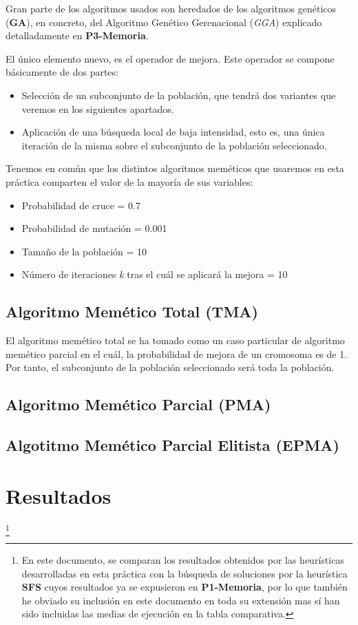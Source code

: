 \documentclass[a4paper, 11pt]{article}
\begin{document}
			Gran parte de los algoritmos usados son heredados de los algoritmos genéticos (\textbf{GA}),
			en concreto, del Algoritmo Genético Gerenacional (\textit{GGA}) explicado detalladamente en
			\textbf{P3-Memoria}.
			
			El único elemento nuevo, es el operador de mejora. Este operador se compone básicamente
			de dos partes:
			\begin{itemize}
				\item Selección de un subconjunto de la población, que tendrá dos variantes que veremos
				en los siguientes apartados.
				\item Aplicación de una búsqueda local de baja intensidad, esto es, una única iteración
				de la misma sobre el subconjunto de la población seleccionado.
			\end{itemize}
			
			Tenemos en común que los distintos algoritmos meméticos que usaremos en esta práctica comparten
			el valor de la mayoría de sus variables:
			\begin{itemize}
				\item Probabilidad de cruce = 0.7
				\item Probabilidad de mutación = 0.001
				\item Tamaño de la población = 10
				\item Número de iteraciones \textit{k} tras el cuál se aplicará la mejora = 10
			\end{itemize}
			
		\subsection{Algoritmo Memético Total (\textbf{TMA})}
			El algoritmo memético total se ha tomado como un caso particular de algoritmo memético parcial
			en el cuál, la probabilidad de mejora de un cromosoma es de 1. Por tanto, el subconjunto de
			la población seleccionado será toda la población.
		
		\subsection{Algoritmo Memético Parcial (\textbf{PMA})}
		\subsection{Algotitmo Memético Parcial Elitista (\textbf{EPMA})}
		
	\section{Resultados}\footnote{En este documento, se comparan los resultados obtenidos por las
	heurísticas desarrolladas en esta práctica con la búsqueda de soluciones por la heurística
	\textbf{SFS} cuyos resultados ya se expusieron en \textbf{P1-Memoria}, por lo que también he
	obviado su inclusión en este documento en toda su extensión mas sí han sido incluidas las medias
	de ejecución en la tabla comparativa.}
	
\end{document}
